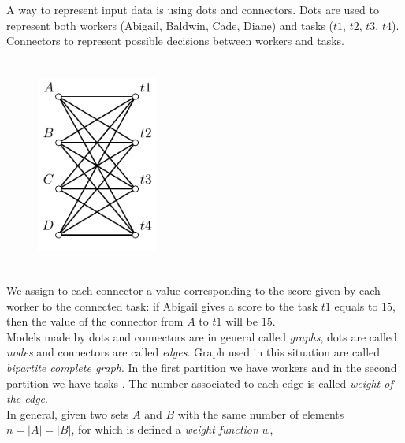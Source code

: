 \documentclass[12pt]{ClasseMatematicamente}
\begin{document}
A way to represent input data is using dots and connectors. Dots are used to represent both workers (Abigail, Baldwin, Cade, Diane) and tasks ($t1$, $t2$, $t3$, $t4$). Connectors to represent possible decisions between workers and tasks. 
\begin{figure}[!ht]
  \centering
  \includegraphics[height=7cm, width=4cm, angle=0,
   keepaspectratio]{figures/bipartite_graph_1.pdf}
  \label{fig:bipartite_graph}
\end{figure}
\noindent
We assign to each connector a value corresponding to the score given by each worker to the connected task: if Abigail gives a score to the task $t1$ equals to $15$, then the value of the connector from $A$ to $t1$ will be $15$. \\ 
Models made by dots and connectors are in general called \emph{graphs}, dots are called \emph{nodes} and connectors are called \emph{edges}. Graph used in this situation are called \emph{bipartite complete graph}. In the first partition we have workers and in the second partition we have tasks \cite{grafi}.
The number associated to each edge is called \emph{weight of the edge}. \\
In general, given two sets $A$ and $B$ with the same number of elements $n = \vert A \vert = \vert B \vert$, for which is defined a \emph{weight function} $w$,
\end{document}
